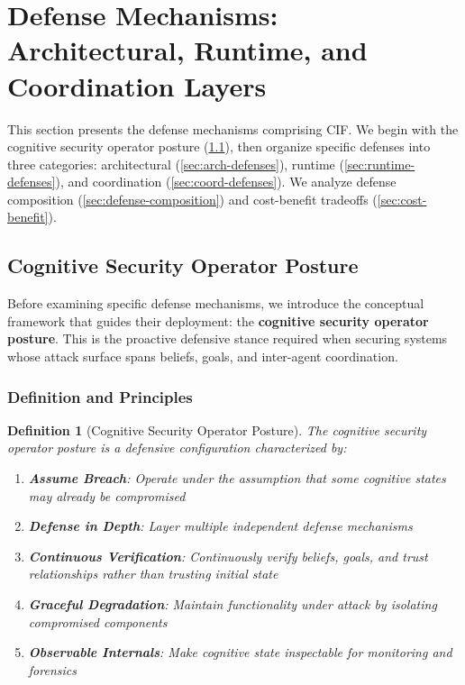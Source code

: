 \documentclass[
]{article}
\newtheorem{definition}{Definition}[section]
\begin{document}
\newpage

\newpage

\section{Defense Mechanisms: Architectural, Runtime, and Coordination
Layers}\label{sec:defense-mechanisms}

This section presents the defense mechanisms comprising CIF. We begin
with the cognitive security operator posture
(\cref{sec:operator-posture}), then organize specific defenses into
three categories: architectural (\cref{sec:arch-defenses}), runtime
(\cref{sec:runtime-defenses}), and coordination
(\cref{sec:coord-defenses}). We analyze defense composition
(\cref{sec:defense-composition}) and cost-benefit tradeoffs
(\cref{sec:cost-benefit}).

\subsection{Cognitive Security Operator
Posture}\label{sec:operator-posture}

Before examining specific defense mechanisms, we introduce the
conceptual framework that guides their deployment: the
\textbf{cognitive security operator posture}. This is the proactive
defensive stance required when securing systems whose attack surface
spans beliefs, goals, and inter-agent coordination.

\subsubsection{Definition and
Principles}\label{definition-and-principles}

\begin{definition}[Cognitive Security Operator Posture]
\label{def:operator-posture}
The cognitive security operator posture is a defensive configuration characterized by:
\begin{enumerate}
\item \textbf{Assume Breach}: Operate under the assumption that some cognitive states may already be compromised
\item \textbf{Defense in Depth}: Layer multiple independent defense mechanisms
\item \textbf{Continuous Verification}: Continuously verify beliefs, goals, and trust relationships rather than trusting initial state
\item \textbf{Graceful Degradation}: Maintain functionality under attack by isolating compromised components
\item \textbf{Observable Internals}: Make cognitive state inspectable for monitoring and forensics
\end{enumerate}
\end{definition}
\end{document}
